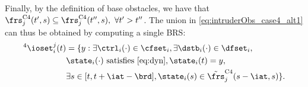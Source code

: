 Finally, by the definition of base obstacles, we have that $\frs_j^{\text{C4}}(t', s) \subseteq \frs_j^{\text{C4}}(t'', s), ~\forall t' > t''$. The union in \eqref{eq:intruderObs_case4_alt1} can thus be obtained by computing a single BRS:
\begin{equation} \label{eq:intruderObs_case4} 
\begin{aligned}
^4\ioset_i^j(t) & = \{y: \exists \ctrl_i(\cdot) \in \cfset_i, \exists \dstb_i(\cdot) \in \dfset_i, \\
& \state_i(\cdot) \text{ satisfies \eqref{eq:dyn}}, \state_i(t) = y, \\
& \exists s \in [t, t + \iat - \brd], \state_i(s) \in \tilde{\frs}_j^{\text{C4}}(s-\iat, s)\}.
\end{aligned}
\end{equation}

